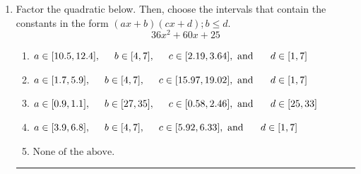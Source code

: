 \documentclass[14pt]{extbook}
\newcommand{\litem}[1]{\item#1\hspace*{-1cm}\rule{\textwidth}{0.4pt}}
\begin{document}
\begin{enumerate}
{\begin{enumerate}[label=\Alph*.]
\end{enumerate} }
\litem{
Factor the quadratic below. Then, choose the intervals that contain the constants in the form $(ax+b)(cx+d); b \leq d.$\[ 36x^{2} +60 x + 25 \]\begin{enumerate}[label=\Alph*.]
\item \( a \in [10.5, 12.4], \hspace*{5mm} b \in [4, 7], \hspace*{5mm} c \in [2.19, 3.64], \text{ and } \hspace*{5mm} d \in [1, 7] \)
\item \( a \in [1.7, 5.9], \hspace*{5mm} b \in [4, 7], \hspace*{5mm} c \in [15.97, 19.02], \text{ and } \hspace*{5mm} d \in [1, 7] \)
\item \( a \in [0.9, 1.1], \hspace*{5mm} b \in [27, 35], \hspace*{5mm} c \in [0.58, 2.46], \text{ and } \hspace*{5mm} d \in [25, 33] \)
\item \( a \in [3.9, 6.8], \hspace*{5mm} b \in [4, 7], \hspace*{5mm} c \in [5.92, 6.33], \text{ and } \hspace*{5mm} d \in [1, 7] \)
\item \( \text{None of the above.} \)


\end{enumerate}}
\end{enumerate}
\end{document}
